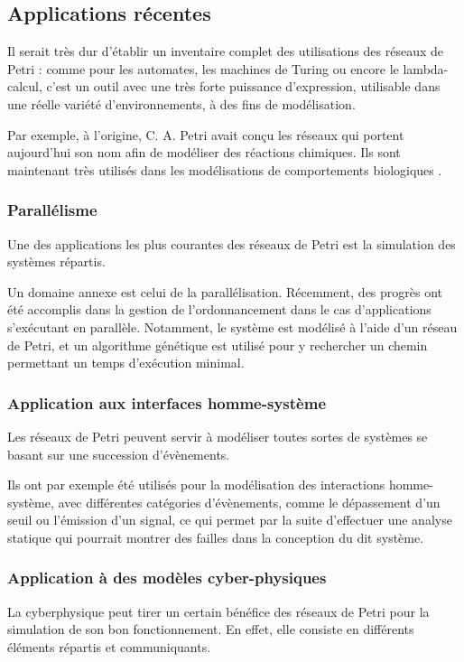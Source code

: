 \subsection{Applications récentes}
Il serait très dur d'établir un inventaire complet des utilisations des réseaux de Petri : comme pour les automates, les machines de Turing ou encore le lambda-calcul, c'est un outil avec une très forte puissance d'expression, utilisable dans une réelle variété d'environnements, à des fins de modélisation.

Par exemple, à l'origine, C. A. Petri avait conçu les réseaux qui portent aujourd'hui son nom afin de modéliser des réactions chimiques. Ils sont maintenant très utilisés dans les modélisations de comportements biologiques \cite{koch2014petri}.

\subsubsection{Parallélisme}
Une des applications les plus courantes des réseaux de Petri est la simulation des systèmes répartis.

Un domaine annexe est celui de la parallélisation. Récemment, des progrès ont été accomplis dans la gestion de l'ordonnancement dans le cas d'applications s'exécutant en parallèle\cite{chen2014research}. Notamment, le système est modélisé à l'aide d'un réseau de Petri, et un algorithme génétique est utilisé pour y rechercher un chemin permettant un temps d'exécution minimal. 

\subsubsection{Application aux interfaces homme-système}
Les réseaux de Petri peuvent servir à modéliser toutes sortes de systèmes se basant sur une succession d'évènements.
 
Ils ont par exemple été utilisés pour la modélisation des interactions homme-système\cite{campos2014elementary}, avec différentes catégories d'évènements, comme le dépassement d'un seuil ou l'émission d'un signal, ce qui permet par la suite d'effectuer une analyse statique qui pourrait montrer des failles dans la conception du dit système.

\subsubsection{Application à des modèles cyber-physiques}
La \gls{cyberphysique} peut tirer un certain bénéfice des réseaux de Petri pour la simulation de son bon fonctionnement. En effet, elle consiste en différents éléments répartis et communiquants.

